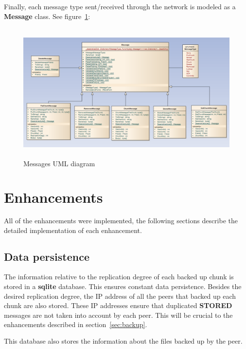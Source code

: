 \documentclass[a4paper]{article}
\begin{document}
Finally, each message type sent/received through the network is modeled as a \textbf{Message} class. See figure~\ref{fig:messages}:

\begin{figure}[h!]
\begin{center}
\includegraphics[height=7cm, width=12cm]{figures/messageUML.PNG}
\caption{Messages UML diagram}
\label{fig:messages}
\end{center}
\end{figure}


\newpage

\section{Enhancements}

All of the enhancements were implemented, the following sections describe the detailed implementation of each enhancement.

\subsection{Data persistence}

The information relative to the replication degree of each backed up chunk is stored in a \textbf{sqlite} database. This ensures constant data persistence. Besides the desired replication degree, the IP address of all the peers that backed up each chunk are also stored. These IP addresses ensure that duplicated \textbf{STORED} messages are not taken into account by each peer. This will be crucial to the enhancements described in section~\ref{sec:backup}.

This database also stores the information about the files backed up by the peer.
\end{document}
